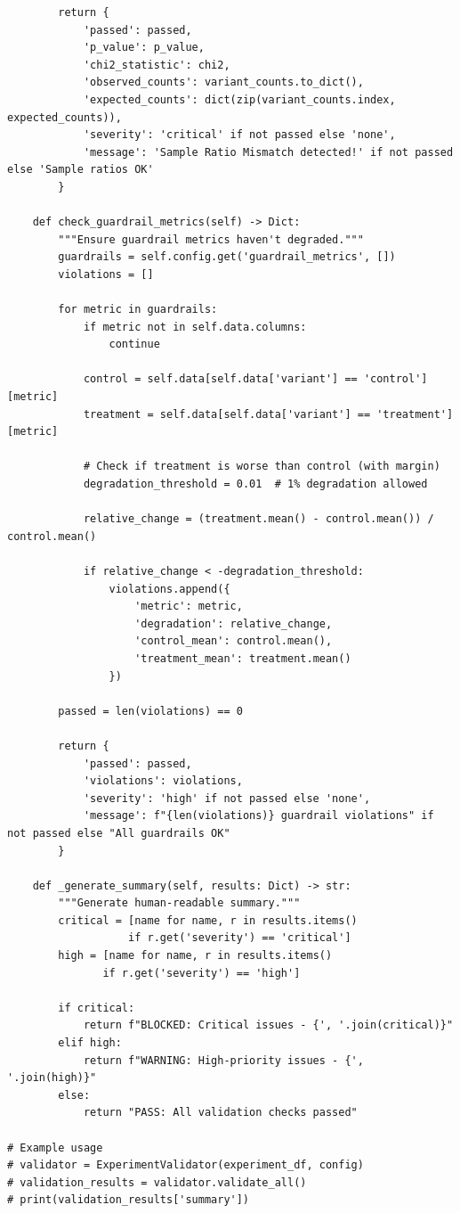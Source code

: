 \begin{lstlisting}
        return {
            'passed': passed,
            'p_value': p_value,
            'chi2_statistic': chi2,
            'observed_counts': variant_counts.to_dict(),
            'expected_counts': dict(zip(variant_counts.index, expected_counts)),
            'severity': 'critical' if not passed else 'none',
            'message': 'Sample Ratio Mismatch detected!' if not passed else 'Sample ratios OK'
        }

    def check_guardrail_metrics(self) -> Dict:
        """Ensure guardrail metrics haven't degraded."""
        guardrails = self.config.get('guardrail_metrics', [])
        violations = []

        for metric in guardrails:
            if metric not in self.data.columns:
                continue

            control = self.data[self.data['variant'] == 'control'][metric]
            treatment = self.data[self.data['variant'] == 'treatment'][metric]

            # Check if treatment is worse than control (with margin)
            degradation_threshold = 0.01  # 1% degradation allowed

            relative_change = (treatment.mean() - control.mean()) / control.mean()

            if relative_change < -degradation_threshold:
                violations.append({
                    'metric': metric,
                    'degradation': relative_change,
                    'control_mean': control.mean(),
                    'treatment_mean': treatment.mean()
                })

        passed = len(violations) == 0

        return {
            'passed': passed,
            'violations': violations,
            'severity': 'high' if not passed else 'none',
            'message': f"{len(violations)} guardrail violations" if not passed else "All guardrails OK"
        }

    def _generate_summary(self, results: Dict) -> str:
        """Generate human-readable summary."""
        critical = [name for name, r in results.items()
                   if r.get('severity') == 'critical']
        high = [name for name, r in results.items()
               if r.get('severity') == 'high']

        if critical:
            return f"BLOCKED: Critical issues - {', '.join(critical)}"
        elif high:
            return f"WARNING: High-priority issues - {', '.join(high)}"
        else:
            return "PASS: All validation checks passed"

# Example usage
# validator = ExperimentValidator(experiment_df, config)
# validation_results = validator.validate_all()
# print(validation_results['summary'])
\end{lstlisting}

